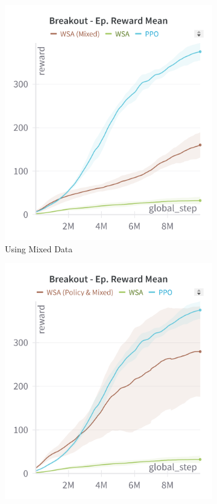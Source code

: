 \begin{figure}[ht]
\begin{subfigure}[b]{0.32\textwidth}
        \includegraphics[width=\textwidth]{images/breakout_expert}
        \caption{Using Mixed Data}
        \label{fig:breakout_expert}
    \end{subfigure}
    \hfill
    \begin{subfigure}[b]{0.32\textwidth}
        \centering
        \includegraphics[width=\textwidth]{images/breakout_policy_mixed}

\end{subfigure}
\end{figure}
